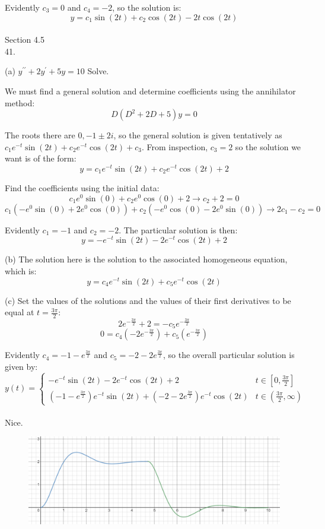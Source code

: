 \documentclass[11pt]{article}
\newcommand{\br}[1]{\left(#1\right)}
\newcommand{\sbr}[1]{\left[#1\right]}
\newcommand{\dprime}{\prime\prime}
\begin{document}
Evidently $c_3 = 0$ and $c_4 = -2$, so the solution is:
$$y = c_1\sin(2t) + c_2\cos(2t) - 2t\cos(2t)$$ \\

Section 4.5 \\

41.

(a) $y^{\dprime} + 2y^{\prime} + 5y = 10$ Solve.

We must find a general solution and determine coefficients using the annihilator method:
$$D\br{D^2 + 2D + 5}y = 0$$

The roots there are $0, -1\pm 2i$, so the general solution is given tentatively as $c_1e^{-t}\sin(2t) + c_2e^{-t}\cos(2t) + c_3$. From inspection, $c_3 = 2$ so the solution we want is of the form:
$$y = c_1e^{-t}\sin(2t) + c_2e^{-t}\cos(2t) + 2$$

Find the coefficients using the initial data:
$$c_1e^{0}\sin(0) + c_2e^{0}\cos(0) + 2 \to c_2 + 2 = 0$$
$$c_1\br{-e^{0}\sin(0)+2e^{0}\cos(0)} + c_2\br{-e^{0}\cos(0)-2e^{0}\sin(0)} \to 2c_1 - c_2 = 0$$

Evidently $c_1 = -1$ and $c_2 = -2$. The particular solution is then:
$$y = -e^{-t}\sin(2t) - 2e^{-t}\cos(2t) + 2$$

(b) The solution here is the solution to the associated homogeneous equation, which is:
$$y = c_4e^{-t}\sin(2t) + c_5e^{-t}\cos(2t)$$

(c) Set the values of the solutions and the values of their first derivatives to be equal at $t = \frac{3\pi}{2}$:
$$2e^{-\frac{3\pi}{2}} + 2 = -c_5e^{-\frac{3\pi}{2}}$$
$$0 = c_4\br{-2e^{-\frac{3\pi}{2}}} + c_5\br{e^{-\frac{3\pi}{2}}}$$

Evidently $c_4 = -1-e^{\frac{3\pi}{2}}$ and $c_5 = -2 - 2e^{\frac{3\pi}{2}}$, so the overall particular solution is given by:
$$y(t) = \begin{cases}
    -e^{-t}\sin(2t) - 2e^{-t}\cos(2t) + 2 & t\in \sbr{0,\frac{3\pi}{2}} \\
    \br{-1-e^{\frac{3\pi}{2}}}e^{-t}\sin(2t) + \br{-2 - 2e^{\frac{3\pi}{2}}}e^{-t}\cos(2t) & t \in \br{\frac{3\pi}{2}, \infty}
\end{cases}$$ \\

Nice.

\begin{figure}[h]
    \centering
    \includegraphics[scale=0.75]{nice}
\end{figure}
\end{document}
